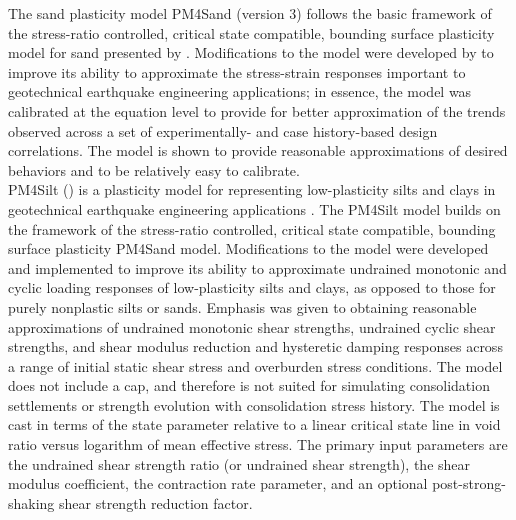 The sand plasticity model PM4Sand (version 3) \cite{boulanger2015pm4sand} follows the basic framework of the stress-ratio controlled, critical
state compatible, bounding surface plasticity model for sand presented by  \cite{dafalias2004simple}.
Modifications to the model were developed by \cite{boulanger2015pm4sand} to improve its ability to
approximate the stress-strain responses important to geotechnical earthquake engineering applications;
in essence, the model was calibrated at the equation level to provide for better approximation of the
trends observed across a set of experimentally- and case history-based design correlations. 
The model is shown to provide reasonable approximations of desired behaviors and to be relatively easy to calibrate. \\



PM4Silt (\cite{boulanger2018pm4silt}) is a plasticity model for representing low-plasticity silts and clays in geotechnical earthquake engineering applications .
 The PM4Silt model builds on the framework of the stress-ratio controlled, critical state compatible, bounding surface plasticity PM4Sand model. 
 Modifications to the model were developed and implemented to improve its ability to approximate undrained monotonic and cyclic loading responses of low-plasticity silts and clays, as opposed to those for purely nonplastic silts or sands. Emphasis was given to obtaining reasonable approximations of undrained monotonic shear strengths, undrained cyclic shear strengths, and shear modulus reduction and hysteretic damping responses across a range of initial static shear stress and overburden stress conditions. The model does not include a cap, and therefore is not suited for simulating consolidation settlements or strength evolution with consolidation stress history. The model is cast in terms of the state parameter relative to a linear critical state line in void ratio versus logarithm of mean effective stress. The primary input parameters are the undrained shear strength ratio (or undrained shear strength), the shear modulus coefficient, the contraction rate parameter, and an optional post-strong-shaking shear strength reduction factor. \\
 
